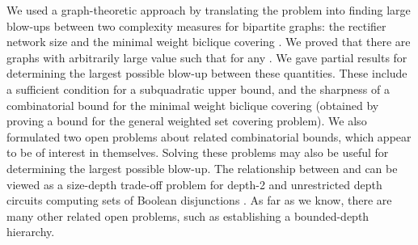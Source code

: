 \documentclass[submission]{llncs}
\begin{document}
We used a graph-theoretic approach by translating the problem into finding large blow-ups between two complexity measures for
bipartite graphs: the rectifier network size  and the minimal weight biclique covering .
We proved that there are graphs with arbitrarily large  value  such that  for any .
We gave partial results for determining the largest possible blow-up between these quantities. These include a sufficient condition for
a subquadratic upper bound, and the sharpness of a combinatorial bound for the minimal weight biclique covering (obtained by proving a bound for the general
weighted set covering problem).
We also formulated two open problems about related combinatorial bounds, which appear to be of interest in themselves.
Solving these problems may also be useful for determining the largest possible blow-up.
The relationship between  and  can be viewed as a size-depth trade-off problem for depth-2 and unrestricted depth circuits computing sets of
Boolean disjunctions \cite{Wegener:1987:CBF:35517}.
As far as we know, there are many other related open problems, such as establishing a bounded-depth hierarchy.








{

{}
}
\end{document}
